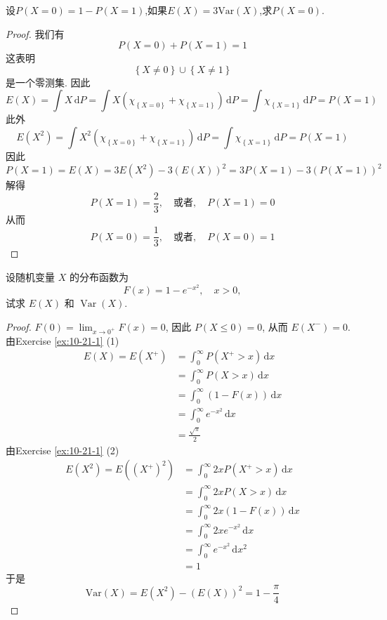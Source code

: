 \documentclass[../main.tex]{subfiles}
\begin{document}
\begin{exercise}{}{}
设$P(X=0)=1-P(X=1)$,如果$E(X)=3\text{Var}(X)$,求$P(X=0)$.
\end{exercise}
\begin{proof}
     我们有 \[
     P\left( X= 0 \right)+ P\left( X= 1 \right)= 1  
     \]这表明 \[
     \left\{ X\neq 0 \right\}\cup \left\{ X\neq 1 \right\}
     \]是一个零测集. 因此 \[
     E\left( X \right)=  \int X\,\mathrm{d} P=  \int X\left( \chi _{\left\{ X= 0 \right\}} + \chi _{\left\{ X= 1 \right\}}\right)\,\mathrm{d} P= \int \chi _{\left\{ X= 1 \right\}} \,\mathrm{d} P= P\left( X= 1 \right) 
     \]此外 \[
     E\left( X^{2} \right)=  \int X ^{2}\left( \chi _{\left\{ X= 0 \right\}}+ \chi _{\left\{ X= 1 \right\}} \right)\,\mathrm{d} P= \int \chi _{\left\{ X= 1 \right\}}\,\mathrm{d} P= P\left( X= 1 \right)   
     \]因此\[
    P\left( X= 1 \right)=   E\left( X \right)=  3 E\left( X^{2} \right)- 3 \left( E\left( X \right)  \right)^{2}   =  3P\left( X= 1 \right)- 3 \left( P\left( X= 1 \right)  \right)^{2}  
     \]解得 \[
     P\left( X= 1 \right)= \frac{2 }{3 }  ,\quad \text{或者},\quad P\left( X= 1 \right)= 0 
     \]从而 \[
     P\left( X= 0 \right)= \frac{1 }{3 },\quad \text{或者} ,\quad P\left( X= 0 \right)= 1   
     \]
\end{proof}
\begin{exercise}{}{}
设随机变量 $X$ 的分布函数为
\[
F(x) = 1 - e^{-x^2}, \quad x>0,
\]
试求 $E(X)$ 和 $\operatorname{Var}(X)$.
\end{exercise}
\begin{proof}
   \(  F\left( 0 \right)= \lim_{x\to 0^{+ }}F\left( x \right)= 0    \), 因此 \(  P\left( X\le 0 \right)= 0   \), 从而 \(  E\left( X^{-} \right)= 0   \).   由Exercise \ref{ex:10-21-1} (1) \[
    \begin{aligned}
    E\left( X \right)=   E\left( X ^{+ }\right)&= \int_{0}^{\infty}P\left( X^{+ }> x \right) \,\mathrm{d} x\\ 
      &= \int_{0}^{\infty}P\left( X> x \right)\,\mathrm{d} x\\  
       &= \int_{0}^{\infty}\left( 1-F\left( x \right)  \right)\,\mathrm{d} x\\ 
        &= \int_{0}^{\infty}e^{-x^{2}}\,\mathrm{d} x\\ 
         &= \frac{\sqrt{ \pi } }{2 }   
    \end{aligned}
     \] 由Exercise \ref{ex:10-21-1}  (2) \[
     \begin{aligned}
     E\left( X^{2} \right)= E\left( \left( X^{+ } \right)^{2}  \right)&=    \int_{0}^{\infty}2xP\left( X^{+ }> x \right)\,\mathrm{d} x \\ 
      &= \int_{0}^{\infty}2xP\left( X> x \right)\,\mathrm{d} x\\ 
       &= \int_{0}^{\infty}2x\left( 1-F\left( x \right)  \right)\,\mathrm{d} x\\ 
        &= \int_{0}^{\infty}2xe^{-x^{2}}\,\mathrm{d} x\\ 
         &= \int_{0}^{\infty}e^{-x^{2}}\,\mathrm{d} x^{2}\\ 
          &= 1  
     \end{aligned}
     \]于是 \[
     \mathrm{Var}\left( X \right)=  E\left( X^{2} \right)-\left( E\left( X \right)  \right)^{2}= 1- \frac{ \pi  }{4 }    
     \]
\end{proof}
\end{document}
